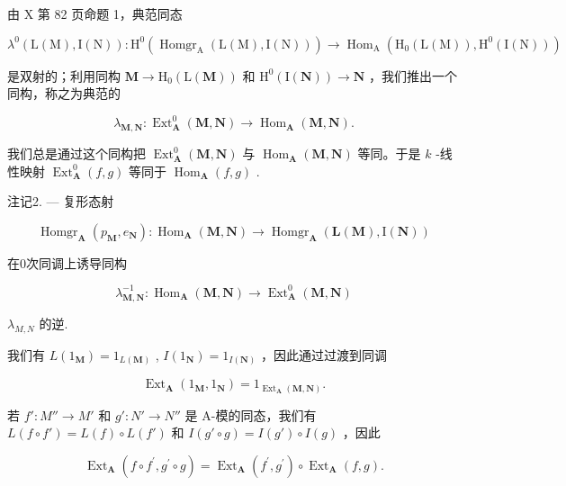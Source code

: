 由 X 第 82 页命题 1，典范同态

\[
\lambda^ {0} (\mathrm{L} (\mathrm{M}), \mathrm{I} (\mathrm{N})): \mathrm{H} ^ {0} \left(\operatorname{Homgr} _ {\mathrm{A}} (\mathrm{L} (\mathrm{M}), \mathrm{I} (\mathrm{N}))\right)\rightarrow \operatorname{Hom} _ {\mathrm{A}} \left(\mathrm{H} _ {0} (\mathrm{L} (\mathrm{M})), \mathrm{H} ^ {0} (\mathrm{I} (\mathrm{N}))\right)
\]

是双射的；利用同构 \(\mathbf{M} \to \mathrm{H}_{0}(\mathrm{L}(\mathbf{M}))\) 和 \(\mathrm{H}^{0}(\mathrm{I}(\mathbf{N})) \to \mathbf{N}\) ，我们推出一个同构，称之为典范的

\[
\lambda_ {\mathbf {M}, \mathbf {N}}: \operatorname{Ext} _ {\mathbf {A}} ^ {0} (\mathbf {M}, \mathbf {N}) \rightarrow \operatorname{Hom} _ {\mathbf {A}} (\mathbf {M}, \mathbf {N}).\tag{7}
\]

我们总是通过这个同构把 \(\operatorname{Ext}_{\mathbf{A}}^{0}(\mathbf{M},\mathbf{N})\) 与 \(\operatorname{Hom}_{\mathbf{A}}(\mathbf{M},\mathbf{N})\) 等同。于是 \(k\) -线性映射 \(\operatorname{Ext}_{\mathbf{A}}^{0}(f,g)\) 等同于 \(\operatorname{Hom}_{\mathbf{A}}(f,g)\) .

注记2. --- 复形态射

\[
\operatorname{Homgr} _ {\mathbf {A}} \left(p _ {\mathbf {M}}, e _ {\mathbf {N}}\right): \operatorname{Hom} _ {\mathbf {A}} (\mathbf {M}, \mathbf {N}) \rightarrow \operatorname{Homgr} _ {\mathbf {A}} \left(\mathbf {L} (\mathbf {M}), \mathrm{I} (\mathbf {N})\right)
\]

在0次同调上诱导同构

\[
\lambda_ {\mathbf {M}, \mathbf {N}} ^ {- 1}: \operatorname{Hom} _ {\mathbf {A}} (\mathbf {M}, \mathbf {N}) \rightarrow \operatorname{Ext} _ {\mathbf {A}} ^ {0} (\mathbf {M}, \mathbf {N})
\]

\(\lambda_{M,N}\) 的逆.

我们有 \(L(1_{\mathbf{M}}) = 1_{L(\mathbf{M})}\) , \(I(1_{\mathbf{N}}) = 1_{I(\mathbf{N})}\) ，因此通过过渡到同调

\[
\operatorname{Ext} _ {\mathbf {A}} \left(1 _ {\mathbf {M}}, 1 _ {\mathbf {N}}\right) = 1 _ {\operatorname{Ext} _ {\mathbf {A}} (\mathbf {M}, \mathbf {N})}.\tag{8}
\]

若 \(f': M'' \to M'\) 和 \(g': N' \to N''\) 是 A-模的同态，我们有 \(L(f \circ f') = L(f) \circ L(f')\) 和 \(I(g' \circ g) = I(g') \circ I(g)\) ，因此

\[
\operatorname{Ext} _ {\mathbf {A}} \left(f \circ f ^ {\prime}, g ^ {\prime} \circ g\right) = \operatorname{Ext} _ {\mathbf {A}} \left(f ^ {\prime}, g ^ {\prime}\right) \circ \operatorname{Ext} _ {\mathbf {A}} (f, g).\tag{9}
\]

